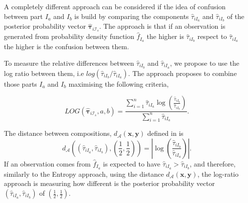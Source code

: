\documentclass[10pt, a4paper]{article}
\newcommand{\m}[1]{\boldsymbol{#1}}
\begin{document}
A completely different approach can be considered if the idea of confusion between part $I_a$ and $I_b$ is build by comparing the components $\hat{\tau}_{iI_a}$ and $\hat{\tau}_{iI_b}$ of the posterior probability vector $\hat{\m \tau}_{i \mathcal{I}_s}$. The approach is that if an observation is generated from probability density function $\hat{f}_{I_a}$ the higher is $\hat{\tau}_{iI_b}$ respect to $\hat{\tau}_{iI_a}$ the higher is the confusion between them. 

%
%


To measure the relative differences between  $\hat{\tau}_{iI_b}$ and $\hat{\tau}_{iI_a}$, we propose to use the log ratio between them, i.e $log( \hat{\tau}_{iI_b}/\hat{\tau}_{iI_a})$. The approach proposes to combine those parts $I_a$ and $I_b$ maximising the following criteria, 

\[
LOG(\hat{\m \tau}_{i \mathcal{I}_s}, a, b) = \frac{\sum_{i=1}^n  \hat{\tau}_{iI_a}  \log( \frac{ \hat{\tau}_{iI_b} }{ \hat{\tau}_{iI_a} })}{\sum_{i=1}^n  \hat{\tau}_{iI_a} }.
\]

The distance between compositions, $d_{\mathcal{A}}(\m x,\m y)$ defined in \citep{aitchison1986statistical} is
\[
d_{\mathcal{A}}\left((\hat{\tau}_{iI_a}, \hat{\tau}_{iI_b}), (\frac{1}{2}, \frac{1}{2})\right) = \left| \log( \frac{ \hat{\tau}_{iI_b} }{ \hat{\tau}_{iI_a} }) \right|.
\]
If an observation comes from $\hat{f}_{I_a}$ is expected to have $\hat{\tau}_{iI_a} > \hat{\tau}_{iI_b}$, and therefore, similarly to the Entropy approach, using the distance $d_{\mathcal{A}}(\m x,\m y)$, the log-ratio approach is measuring how different is the posterior probability vector $(\hat{\tau}_{iI_a}, \hat{\tau}_{iI_b})$ of $(\frac{1}{2}, \frac{1}{2})$.
\end{document}
